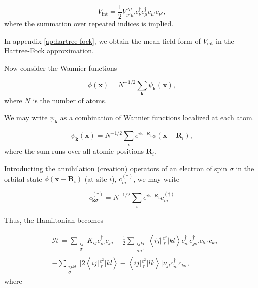 \begin{equation}\label{eq:vInt}
V_{\text{int}} = \frac{1}{2} V^{\nu\mu}_{\nu'\mu'} c_\nu^\dagger c_\mu^\dagger c_{\mu'} c_{\nu'} ,
\end{equation}
where the summation over repeated indices is implied. 

In appendix \ref{ap:hartree-fock}, we obtain the mean field form of $V_{\text{int}}$ in the Hartree-Fock approximation.

Now consider the Wannier functions

\begin{equation}
\phi(\bm x) = N^{-1/2} \sum_{\bm k} \psi_{\bm k} (\bm x) , 
\end{equation}
where $N$ is the number of atoms.

We may write $\psi_{\bm k}$ as a combination of Wannier functions localized at each atom.

\begin{equation}
\psi_{\bm k} (\bm x) = N^{-1/2} \sum_i e^{i \bm k \cdot \bm R_i} \phi (\bm x - \bm R_i) ,
\end{equation}
where the sum runs over all atomic positions $\bm R_i$. 

Introducting the annihilation (creation) operators of an electron of spin $\sigma$ in the orbital state $\phi (\bm x - \bm R_i)$ (at site $i$), $c_{i\sigma}^{(\dagger)}$, we may write

\begin{equation}
c_{\bm k \sigma}^{(\dagger)} = N^{-1/2} \sum_i e^{i \bm k \cdot \bm R_i} c_{i\sigma}^{(\dagger)}
\end{equation}

Thus, the Hamiltonian becomes 

\begin{equation}
\begin{split}
&\mathcal{H} = \sum_{\substack{ i j \\ \sigma} } K_{ij} c_{i \sigma}^\dagger c_{j \sigma} + \frac{1}{2} \sum_{\substack{i j k l \\ \sigma \sigma'} }\left\langle i j \bigg| \frac{e^2}{r} \bigg| k l \right\rangle 
 c_{i \sigma}^\dagger c_{j \sigma'}^\dagger c_{l \sigma'} c_{ k \sigma} \\
 &- \sum_{\substack{ijkl \\ \sigma }} \bigg[ 2 \left\langle i j \bigg| \frac{e^2}{r} \bigg| k l \right\rangle - \left\langle i j \bigg| \frac{e^2}{r} \bigg| l k \right\rangle \bigg] \nu_{j l} c_{i \sigma}^\dagger c_{ k \sigma} ,
\end{split}
\end{equation}
where

